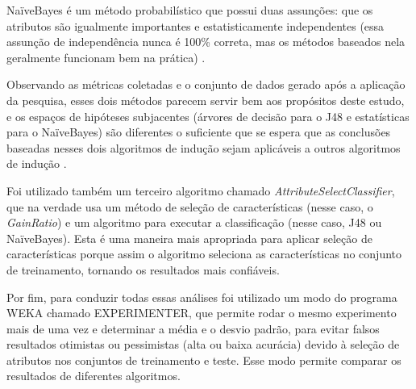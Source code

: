 NaïveBayes é um método probabilístico que possui duas assunções: que os atributos são igualmente importantes e estatisticamente independentes (essa assunção de independência nunca é 100\% correta, mas os métodos baseados nela geralmente funcionam bem na prática) \cite{Langley92ananalysis}. 

Observando as métricas coletadas e o conjunto de dados gerado após a aplicação da pesquisa, esses dois métodos parecem servir bem aos propósitos deste estudo, e os espaços de hipóteses subjacentes (árvores de decisão para o J48 e estatísticas para o NaïveBayes) são diferentes o suficiente que se espera que as conclusões baseadas nesses dois algoritmos de indução sejam aplicáveis a outros algoritmos de indução \cite{kohavi1995study}.

Foi utilizado também um terceiro algoritmo chamado \textit{AttributeSelectClassifier}, que na verdade usa um método de seleção de características (nesse caso, o \textit{GainRatio}) e um algoritmo para executar a classificação (nesse caso, J48 ou NaïveBayes). Esta é uma maneira mais apropriada para aplicar seleção de características porque assim o algoritmo seleciona as características no conjunto de treinamento, tornando os resultados mais confiáveis.

Por fim, para conduzir todas essas análises foi utilizado um modo do programa WEKA chamado EXPERIMENTER, que permite rodar o mesmo experimento mais de uma vez e determinar a média e o desvio padrão, para evitar falsos resultados otimistas ou pessimistas (alta ou baixa acurácia) devido à seleção de atributos nos conjuntos de treinamento e teste. Esse modo permite comparar os resultados de diferentes algoritmos.






















